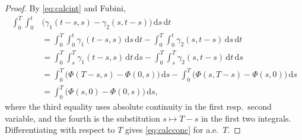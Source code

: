 \documentclass[11pt,a4paper]{article}
\theoremstyle{plain}
\theoremstyle{definition}
\theoremstyle{remark}
\newcommand{\dif}{\,\mathrm{d}}
\begin{document}
\begin{proof}
  By \eqref{eq:calcint} and Fubini,
  \begin{align*}
    \int_0^T \!\! \int_0^t &\bigl( \gamma_1(t-s,s) - \gamma_2(s,t-s) \bigr) \dif s \dif t \\
    &= \int_0^T \!\! \int_0^t \! \gamma_1(t-s,s) \dif s \dif t
       - \int_0^T \!\! \int_0^t \! \gamma_2(s,t-s) \dif s \dif t \\
    &= \int_0^T \!\! \int_s^T \! \gamma_1(t-s,s) \dif t \dif s
       - \int_0^T \!\! \int_s^T \! \gamma_2(s,t-s) \dif t \dif s \\
    &= \int_0^T \bigl( \Phi(T-s,s) - \Phi(0,s) \bigr) \dif s
       - \int_0^T \bigl( \Phi(s,T-s) - \Phi(s,0) \bigr) \dif s \\
    &= \int_0^T \bigl( \Phi(s,0) - \Phi(0,s) \bigr) \dif s ,
  \end{align*}
  where the third equality uses absolute continuity in the first resp.\ second
  variable, and the fourth is the substitution $s \mapsto T-s$ in the first two
  integrals.  Differentiating with respect to $T$ gives \eqref{eq:calcconc} for
  a.e.\ $T$.
\end{proof}
\end{document}
